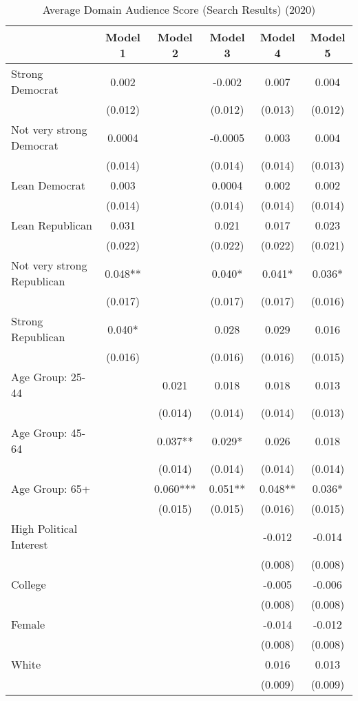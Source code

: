 \begin{table}

\caption{Average Domain Audience Score (Search Results) (2020)}
\centering
\begin{tabular}[t]{lccccc}
\toprule
  & Model 1 & Model 2 & Model 3 & Model 4 & Model 5\\
\midrule
Strong Democrat & 0.002 &  & -0.002 & 0.007 & 0.004\\
 & (0.012) &  & (0.012) & (0.013) & (0.012)\\
Not very strong Democrat & 0.0004 &  & -0.0005 & 0.003 & 0.004\\
 & (0.014) &  & (0.014) & (0.014) & (0.013)\\
Lean Democrat & 0.003 &  & 0.0004 & 0.002 & 0.002\\
 & (0.014) &  & (0.014) & (0.014) & (0.014)\\
Lean Republican & 0.031 &  & 0.021 & 0.017 & 0.023\\
 & (0.022) &  & (0.022) & (0.022) & (0.021)\\
Not very strong Republican & 0.048** &  & 0.040* & 0.041* & 0.036*\\
 & (0.017) &  & (0.017) & (0.017) & (0.016)\\
Strong Republican & 0.040* &  & 0.028 & 0.029 & 0.016\\
 & (0.016) &  & (0.016) & (0.016) & (0.015)\\
Age Group: 25-44 &  & 0.021 & 0.018 & 0.018 & 0.013\\
 &  & (0.014) & (0.014) & (0.014) & (0.013)\\
Age Group: 45-64 &  & 0.037** & 0.029* & 0.026 & 0.018\\
 &  & (0.014) & (0.014) & (0.014) & (0.014)\\
Age Group: 65+ &  & 0.060*** & 0.051** & 0.048** & 0.036*\\
 &  & (0.015) & (0.015) & (0.016) & (0.015)\\
High Political Interest &  &  &  & -0.012 & -0.014\\
 &  &  &  & (0.008) & \vphantom{2} (0.008)\\
College &  &  &  & -0.005 & -0.006\\
 &  &  &  & (0.008) & \vphantom{1} (0.008)\\
Female &  &  &  & -0.014 & -0.012\\
 &  &  &  & (0.008) & (0.008)\\
White &  &  &  & 0.016 & 0.013\\
 &  &  &  & (0.009) & (0.009)\\

\end{tabular}
\end{table}

